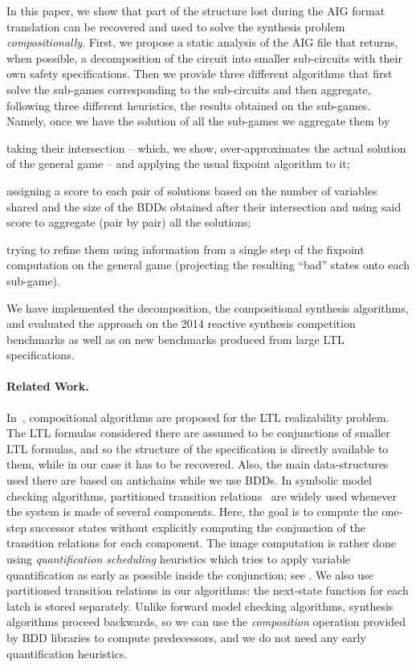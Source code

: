 \documentclass[submission,copyright,creativecommons]{eptcs}
\begin{document}
In this paper, we show that part of the structure lost during the AIG format
translation can be recovered and used to solve the synthesis problem {\em
compositionally}.  First, we propose a static analysis of the AIG file that
returns, when possible, a decomposition of the circuit into smaller sub-circuits
with their own safety specifications. Then we provide three different algorithms
that first solve the sub-games corresponding to the sub-circuits and then
aggregate, following three different heuristics, the results obtained on the
sub-games. Namely, once we have the solution of all the sub-games we aggregate
them by
\begin{inparaenum}[$(i)$]
	\item taking their intersection -- which, we show, over-approximates the
		actual solution of the general game -- and applying the usual
		fixpoint algorithm to it;
	\item assigning a score to each pair of solutions based on the number of
		variables shared and the size of the BDDs obtained after their
		intersection and using said score to aggregate (pair by pair)
		all the solutions;
	\item trying to refine them using information from a single step of the
		fixpoint computation on the general game (\ie projecting the
		resulting ``bad'' states onto each sub-game).
\end{inparaenum}
We have implemented the decomposition, the compositional synthesis
algorithms, and evaluated the approach on the 2014 reactive synthesis
competition benchmarks as well as on new benchmarks produced from large LTL
specifications.

\paragraph{Related Work.}
In~\cite{FiliotJR10,FiliotJR11}, compositional algorithms are proposed for the
LTL realizability problem. The LTL formulas considered there are assumed to be
conjunctions of smaller LTL formulas, and so the structure of the specification
is directly available to them, while in our case it has to be recovered.  Also,
the main data-structures used there are based on antichains while we use BDDs.
In symbolic model checking algorithms, partitioned transition
relations~\cite{burch1991symbolic} are widely used whenever the system is made
of several components. Here, the goal is to compute the one-step successor
states without explicitly computing the conjunction of the transition relations
for each component.  The image computation is rather done using
\emph{quantification scheduling} heuristics which tries to apply variable
quantification as early as possible inside the conjunction; see \eg
\cite{wang2003compositional}.  We also use partitioned transition relations in
our algorithms: the next-state function for each latch is stored separately.
Unlike forward model checking algorithms, synthesis algorithms proceed
backwards, so we can use the \emph{composition} operation provided by BDD
libraries to compute predecessors, and we do not need any early quantification
heuristics.
\end{document}
